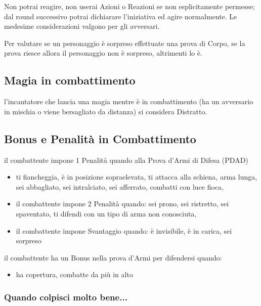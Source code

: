 \documentclass[12pt,a4paper,twoside,openany]{book}
\begin{document}
\begin{multicols}{2}
Non potrai reagire, non userai Azioni o Reazioni se non esplicitamente permesse; dal round successivo potrai dichiarare l'iniziativa ed agire normalmente. Le medesime considerazioni valgono per gli avversari.

Per valutare se un personaggio è sorpreso effettuate una prova di Corpo, se la prova riesce allora il personaggio non è sorpreso, altrimenti lo è.

\subsection{Magia in combattimento}\label{magiaincombattimento}

l'incantatore che lancia una magia mentre è in combattimento (ha un avversario in mischia o viene bersagliato da distanza) si considera Distratto.

\subsection{Bonus e Penalità in Combattimento}

il combattente impone 1 Penalità quando alla Prova d'Armi di Difesa (PDAD)

\begin{itemize}

\item ti fiancheggia, è in posizione sopraelevata, ti attacca alla schiena, arma lunga, sei abbagliato, sei intralciato, sei afferrato, combatti con luce fioca, 

\item 
il combattente impone 2 Penalità quando:
\subitem sei prono, sei ristretto, sei spaventato, ti difendi con un tipo di arma non conosciuta, 

\item 
il combattente impone Svantaggio quando:
\subitem è invisibile, è in carica, sei sorpreso

\end{itemize}

il combattente ha un Bonus nella prova d'Armi per difendersi quando:

\begin{itemize}
	
\item 
ha copertura, combatte da più in alto

\end{itemize}

\subsubsection{Quando colpisci molto bene...}


\end{multicols}
\end{document}

